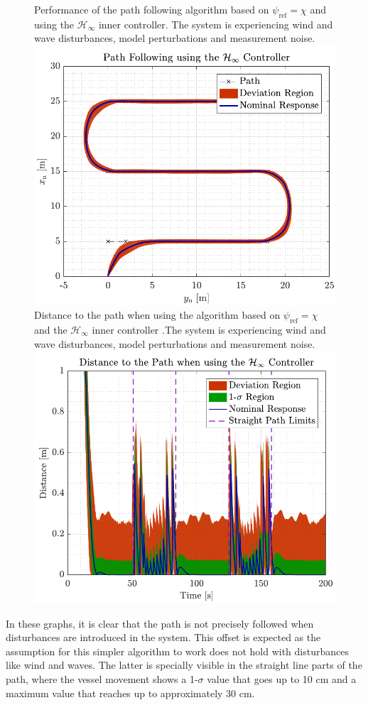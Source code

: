 \begin{figure}[H]
	\captionbox 
	{   
		Performance of the path following algorithm based on $\psi_\mathrm{ref}=\chi$ and using the $\mathcal{H}_\infty$ inner controller. The system is experiencing wind and wave disturbances, model perturbations and measurement noise.\label{fig:robwrong}
	}                                                                 
	{                                                                  
		\includegraphics[width=.45\textwidth]{figures/path_rob_no_correc}         
	}                                                                    
	\hspace{5pt}                                                          
	\captionbox  
	{      
		Distance to the path when using the algorithm based on $\psi_\mathrm{ref}=\chi$ and the $\mathcal{H}_\infty$ inner controller .The system is experiencing wind and wave disturbances, model perturbations and measurement noise.\label{fig:distrobwrong}
	}                                                                          
	{
		\includegraphics[width=.45\textwidth]{figures/dist_rob_no_correc}
	}
\end{figure}

In these graphs, it is clear that the path is not precisely followed when disturbances are introduced in the system. This offset is expected as the assumption for this simpler algorithm to work does not hold with disturbances like wind and waves. The latter is specially visible in the straight line parts of the path, where the vessel movement shows a 1-$\sigma$ value that goes up to 10 cm and a maximum value that reaches up to approximately 30 cm.

